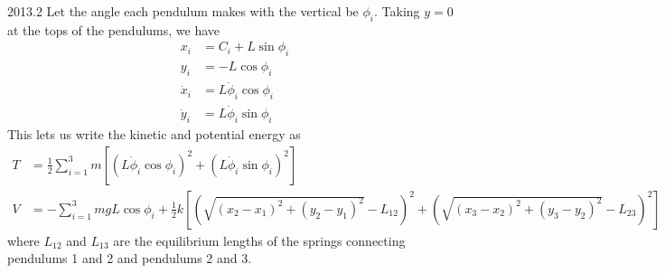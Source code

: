 \documentclass[12pt]{article}
\begin{document}
\begin{solution}{2013.2}
Let the angle each pendulum makes with the vertical be $\phi_i$.
Taking $y = 0$ at the tops of the pendulums, we have
\begin{align*}
x_i & = C_i + L \sin \phi_i \\
y_i & = -L \cos \phi_i \\
\dot{x}_i & = L \dot{\phi}_i \cos \phi_i \\
\dot{y}_i & = L \dot{\phi}_i \sin \phi_i
\end{align*}
This lets us write the kinetic and potential energy as
\begin{align*}
T & = \frac{1}{2} \sum_{i=1}^3 m \left[ 
\left( L \dot{\phi}_i \cos \phi_i \right)^2 + \left( L \dot{\phi}_i \sin \phi_i \right)^2 \right] \\
V & = -\sum_{i=1}^3 mgL \cos \phi_i + 
\frac{1}{2} k \left[ (\sqrt{(x_2 - x_1)^2 + (y_2 - y_1)^2} - L_{12})^2 
+ (\sqrt{(x_3 - x_2)^2 + (y_3 - y_2)^2} - L_{23})^2 \right]
\end{align*}
where $L_{12}$ and $L_{13}$ are the equilibrium lengths of the springs connecting pendulums 1 and 2 and pendulums 2 and 3.


\end{solution}
\end{document}
